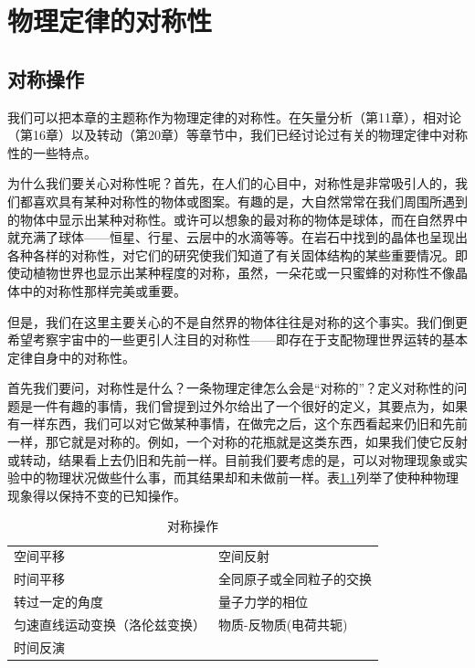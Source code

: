 \chapter{物理定律的对称性}

\section{对称操作}

我们可以把本章的主题称作为物理定律的对称性。在矢量分析（第11章），相对论（第16章）以及转动（第20章）等章节中，我们已经讨论过有关的物理定律中对称性的一些特点。

为什么我们要关心对称性呢？首先，在人们的心目中，对称性是非常吸引人的，我们都喜欢具有某种对称性的物体或图案。有趣的是，大自然常常在我们周围所遇到的物体中显示出某种对称性。或许可以想象的最对称的物体是球体，而在自然界中就充满了球体——恒星、行星、云层中的水滴等等。在岩石中找到的晶体也呈现出各种各样的对称性，对它们的研究使我们知道了有关固体结构的某些重要情况。即使动植物世界也显示出某种程度的对称，虽然，一朵花或一只蜜蜂的对称性不像晶体中的对称性那样完美或重要。

但是，我们在这里主要关心的不是自然界的物体往往是对称的这个事实。我们倒更希望考察宇宙中的一些更引人注目的对称性——即存在于支配物理世界运转的基本定律自身中的对称性。

首先我们要问，对称性是什么？一条物理定律怎么会是“对称的”？定义对称性的问题是一件有趣的事情，我们曾提到过外尔给出了一个很好的定义，其要点为，如果有一样东西，我们可以对它做某种事情，在做完之后，这个东西看起来仍旧和先前一样，那它就是对称的。例如，一个对称的花瓶就是这类东西，如果我们使它反射或转动，结果看上去仍旧和先前一样。目前我们要考虑的是，可以对物理现象或实验中的物理状况做些什么事，而其结果却和未做前一样。表\ref{Table:52:1}列举了使种种物理现象得以保持不变的已知操作。

\begin{table}[H]
    \caption{对称操作}
    \label{Table:52:1}
    \centering
    \small
    \begin{tabularx}{0.8\textwidth}{|>{\centering\arraybackslash}X||>{\centering\arraybackslash}X|}
        \hline 
        空间平移 & 空间反射 \\ 
        时间平移 & 全同原子或全同粒子的交换 \\ 
        转过一定的角度 & 量子力学的相位 \\ 
        匀速直线运动变换（洛伦兹变换） & 物质-反物质(电荷共轭) \\ 
        时间反演 & ~ \\ \hline 
    \end{tabularx}
\end{table}

